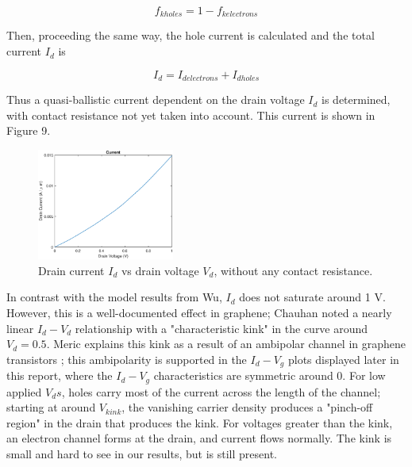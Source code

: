 \documentclass[11pt]{article}
\begin{document}
$$f_{kholes}=1-f_{kelectrons}$$

Then, proceeding the same way, the hole current is calculated and the total current $I_d$ is

$$I_d = I_{delectrons}+I_{dholes}$$

Thus a quasi-ballistic current dependent on the drain voltage $I_d$ is determined, with contact resistance not yet taken into account. This current is shown in Figure 9.

\begin{figure}[h!]
\centering 
\includegraphics[width=0.4\textwidth]{current.eps}
\caption{Drain current $I_d$ vs drain voltage $V_d$, without any contact resistance.}\label{fig:FET}
\end{figure}

In contrast with the model results from Wu, $I_d$ does not saturate around 1 V. However, this is a well-documented effect in graphene; Chauhan noted a nearly linear $I_d-V_d$ relationship with a "characteristic kink" in the curve around $V_d=0.5$\cite{chauhan2011}. Meric explains this kink as a result of an ambipolar channel in graphene transistors \cite{meric2011}; this ambipolarity is supported in the $I_d-V_g$ plots displayed later in this report, where the $I_d-V_g$ characteristics are symmetric around 0. For low applied $V_ds$, holes carry most of the current across the length of the channel; starting at around $V_{kink}$, the vanishing carrier density produces a "pinch-off region" in the drain that produces the kink. For voltages greater than the kink, an electron channel forms at the drain, and current flows normally. The kink is small and hard to see in our results, but is still present.
\end{document}
